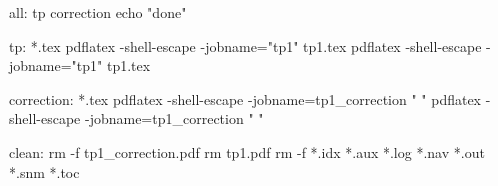 all: tp correction
	echo "done"


tp: *.tex
	pdflatex -shell-escape -jobname="tp1" tp1.tex
	pdflatex -shell-escape -jobname="tp1" tp1.tex


correction: *.tex
	pdflatex -shell-escape -jobname=tp1_correction "\def\koriG{} "
	pdflatex -shell-escape -jobname=tp1_correction "\def\koriG{} "

clean:
	rm -f tp1_correction.pdf rm tp1.pdf
	rm -f *.idx *.aux *.log *.nav *.out *.snm *.toc